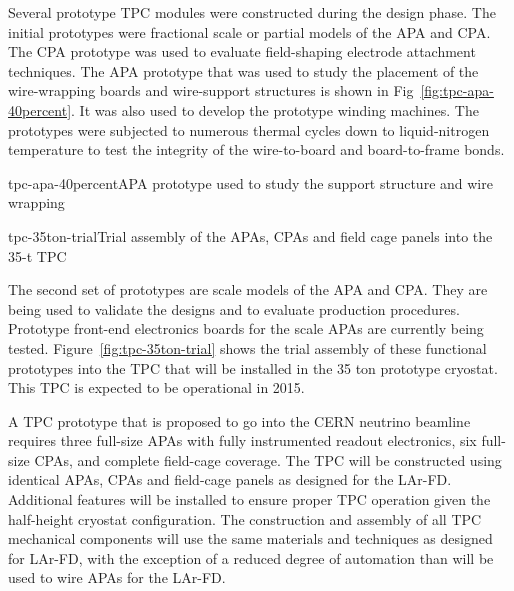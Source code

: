 
Several prototype TPC modules were constructed during the design phase. The initial prototypes were fractional scale or partial models of the APA and CPA. The CPA prototype was used to evaluate field-shaping electrode attachment techniques. The APA prototype that was used to study the placement of the wire-wrapping boards and wire-support structures is shown in Fig~\ref{fig:tpc-apa-40percent}. It was also used to develop the prototype winding machines. The prototypes were subjected to numerous thermal cycles down to liquid-nitrogen temperature to test the integrity of the wire-to-board and board-to-frame bonds. 


\begin{cdrfigure}{tpc-apa-40percent}{APA prototype used to study the support structure and wire wrapping}
\end{cdrfigure}

\begin{cdrfigure}{tpc-35ton-trial}{Trial assembly of the APAs, CPAs and field cage panels into the 35-t TPC}
\end{cdrfigure}

The second set of prototypes are scale models of the APA and CPA. They are being used to validate the designs and to evaluate production procedures. Prototype front-end electronics boards for the scale APAs are currently being tested. Figure~\ref{fig:tpc-35ton-trial} shows the trial assembly of these functional prototypes into the TPC that will be installed in the 35 ton prototype cryostat. This TPC is expected to be operational in 2015.

A TPC prototype that is proposed to go into the CERN neutrino beamline requires three full-size APAs with fully instrumented readout electronics, six full-size CPAs, and complete field-cage coverage. The TPC will be constructed using identical APAs, CPAs and field-cage panels as designed for the LAr-FD. Additional features will be installed to ensure proper TPC operation given the half-height cryostat configuration. The construction and assembly of all TPC mechanical components will use the same materials and techniques as designed for LAr-FD, with the exception of a reduced degree of automation than will be used to wire APAs for the LAr-FD. 

